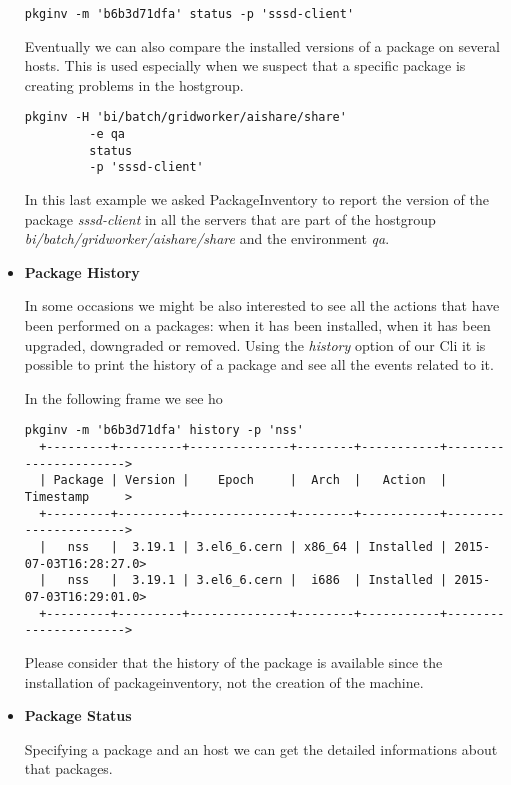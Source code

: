 \begin{itemize}
  \begin{lstlisting}[frame=single]
  pkginv -m 'b6b3d71dfa' status -p 'sssd-client'
  \end{lstlisting}
 
  Eventually we can also compare the installed versions of a package on
  several hosts. This is used especially when we suspect that a specific
  package is creating problems in the hostgroup.
  
  \begin{lstlisting}[frame=single]
  pkginv -H 'bi/batch/gridworker/aishare/share'
         -e qa
         status
         -p 'sssd-client'
  \end{lstlisting}

  In this last example we asked PackageInventory to report the version of
  the package \textit{sssd-client} in all the servers that are part of the
  hostgroup \textit{bi/batch/gridworker/aishare/share} and the environment
  \textit{qa}.
  
  \item \textbf{Package History}

  In some occasions we might be also interested to see all the actions
  that have been performed on a packages: when it has been installed, when
  it has been upgraded, downgraded or removed. Using the \textit{history}
  option of our Cli it is possible to print the history of a package and
  see all the events related to it.

  In the following frame we see ho

  \begin{lstlisting}[frame=single]
  pkginv -m 'b6b3d71dfa' history -p 'nss'
  +---------+---------+--------------+--------+-----------+---------------------->
  | Package | Version |    Epoch     |  Arch  |   Action  |        Timestamp     >
  +---------+---------+--------------+--------+-----------+---------------------->
  |   nss   |  3.19.1 | 3.el6_6.cern | x86_64 | Installed | 2015-07-03T16:28:27.0>
  |   nss   |  3.19.1 | 3.el6_6.cern |  i686  | Installed | 2015-07-03T16:29:01.0>
  +---------+---------+--------------+--------+-----------+---------------------->
  \end{lstlisting}
 
  Please consider that the history of the package is available since the
  installation of packageinventory, not the creation of the machine.
 
  \item \textbf{Package Status}

Specifying a package and an host we can get the detailed informations about
  that packages.
 

\end{itemize}
